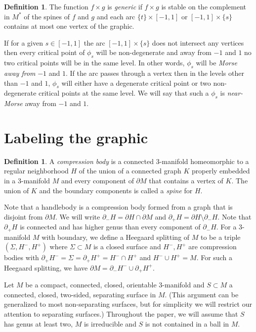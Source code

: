 \documentclass[12pt]{amsart}
\theoremstyle{plain}
\theoremstyle{definition}
\newtheorem{Def}[Thm]{Definition}
\begin{document}
\begin{Def}
The function $f \times g$ is \textit{generic} if $f \times g$ is stable on the complement in $M^*$ of the spines of $f$ and $g$ and each arc $\{t\} \times [-1,1]$ or $[-1,1] \times \{s\}$ contains at most one vertex of the graphic.
\end{Def}

If for a given $s \in [-1,1]$ the arc $[-1,1] \times \{s\}$ does not intersect any vertices then every critical point of $\phi_s$ will be non-degenerate and away from $-1$ and $1$ no two critical points will be in the same level.  In other words, $\phi_s$ will be \textit{Morse away from} $-1$ and $1$.  If the arc passes through a vertex then in the levels other than $-1$ and $1$, $\phi_s$ will either have a degenerate critical point or two non-degenerate critical points at the same level.  We will say that such a $\phi_s$ is \textit{near-Morse} away from $-1$ and $1$.





\section{Labeling the graphic}
\label{labelsect}

\begin{Def}
A \textit{compression body} is a connected 3-manifold homeomorphic to a regular neighborhood $H$ of the union of a connected graph $K$ properly embedded in a 3-manifold $M$ and every component of $\partial M$ that contains a vertex of $K$.  The union of $K$ and the boundary components is called a \textit{spine} for $H$.  
\end{Def}

Note that a handlebody is a compression body formed from a graph that is disjoint from $\partial M$.  We will write $\partial_- H = \partial H \cap \partial M$ and $\partial_+ H = \partial H \setminus \partial_- H$.  Note that $\partial_+ H$ is connected and has higher genus than every component of $\partial_- H$.  For a 3-manifold $M$ with boundary, we define a Heegaard splitting of $M$ to be a triple $(\Sigma, H^-, H^+)$ where $\Sigma \subset M$ is a closed surface and $H^-, H^+$ are compression bodies with $\partial_+ H^- = \Sigma = \partial_+ H^+ = H^- \cap H^+$ and $H^- \cup H^+ = M$.  For such a Heegaard splitting, we have $\partial M = \partial_- H^- \cup \partial_+ H^+$.

Let $M$ be a compact, connected, closed, orientable 3-manifold and $S \subset M$ a connected, closed, two-sided, separating surface in $M$.  (This argument can be generalized to most non-separating surfaces, but for simplicity we will restrict our attention to separating surfaces.)  Throughout the paper, we will assume that $S$ has genus at least two, $M$ is irreducible and $S$ is not contained in a ball in $M$.  
\end{document}
